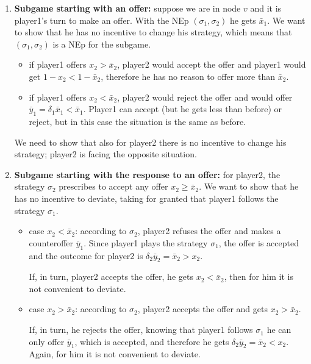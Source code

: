 \begin{enumerate}
	\item \textbf{Subgame starting with an offer:} suppose we are in node $v$ and it is player1's turn to make an offer. With the NEp $(\sigma_1,\sigma_2)$ he gets $\bar{x}_1$. We want to show that he has no incentive to change his strategy, which means that $(\sigma_1,\sigma_2)$ is a NEp for the subgame.
	\begin{itemize}
		\item if player1 offers $x_2 > \bar{x}_2$, player2 would accept the offer and player1 would get $1 - x_2 < 1 - \bar{x}_2$, therefore he has no reason to offer more than $\bar{x}_2$.
		\item if player1 offers $x_2 < \bar{x}_2$, player2 would reject the offer and would offer $\bar{y}_1 = \delta_1\bar{x}_1 < \bar{x}_1$. Player1 can accept (but he gets less than before) or reject, but in this case the situation is the same as before.
	\end{itemize}
	We need to show that also for player2 there is no incentive to change his strategy; player2 is facing the opposite situation.
	
	\item \textbf{Subgame starting with the response to an offer:} for player2, the strategy $\sigma_2$ prescribes to accept any offer $x_2 \geq \bar{x}_2$. We want to show that he has no incentive to deviate, taking for granted that player1 follows the strategy $\sigma_1$.
	\begin{itemize}
		\item case $x_2 < \bar{x}_2$: according to $\sigma_2$, player2 refuses the offer and makes a counteroffer $\bar{y}_1$. Since player1 plays the strategy $\sigma_1$, the offer is accepted and the outcome for player2 is $\delta_2\bar{y}_2 = \bar{x}_2 > x_2$.
		
		\noindent If, in turn, player2 accepts the offer, he gets $x_2 < \bar{x}_2$, then for him it is not convenient to deviate.
		
		\item case $x_2 > \bar{x}_2$: according to $\sigma_2$, player2 accepts the offer and gets $x_2 > \bar{x}_2$.
		
		\noindent If, in turn, he rejects the offer, knowing that player1 follows $\sigma_1$ he can only offer $\bar{y}_1$, which is accepted, and therefore he gets $\delta_2\bar{y}_2 = \bar{x}_2 < x_2$. Again, for him it is not convenient to deviate.
	\end{itemize}
\end{enumerate}

